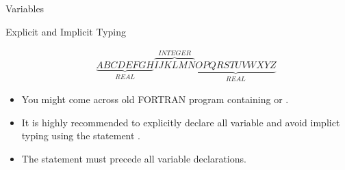 \documentclass[10pt,t]{beamer}
\begin{document}
\begin{frame}[allowframebreaks]{Variables}
\begin{eblock}{Explicit and Implicit Typing}
\begin{itemize}
        \begin{gather*}
          \underbrace{ABCDEFGH}_{REAL}\overbrace{IJKLMN}^{INTEGER}\underbrace{OPQRSTUVWXYZ}_{REAL}
        \end{gather*}
      \item You might come across old FORTRAN program containing  or .
      \item It is highly recommended to explicitly declare all variable and avoid implict typing using the statement .
      \item The  statement must precede all variable declarations.
    \end{itemize}
  \end{eblock}
\end{frame}
  
\end{document}
